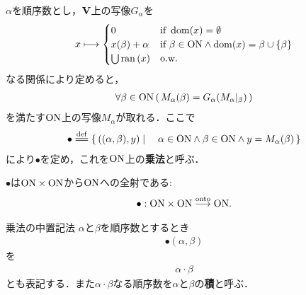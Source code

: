 	\begin{screen}
		\begin{dfn}[順序数の乗法]
			$\alpha$を順序数とし，$\mathbf{V}$上の写像$G_\alpha$を
			\begin{align}
				x \longmapsto 
				\begin{cases}
					0 & \mbox{if } \operatorname{dom}(x) = \emptyset \\
					x(\beta) + \alpha & \mbox{if } \beta \in \mathrm{ON} \wedge \operatorname{dom}(x) = \beta \cup \{\beta\} \\
					\bigcup \operatorname*{ran} \left(x\right) & \mbox{o.w.}
				\end{cases}
			\end{align}
			なる関係により定めると，
			\begin{align}
				\forall \beta \in \mathrm{ON}\, (\, M_\alpha(\beta) = G_\alpha(M_\alpha|_\beta)\, )
			\end{align}
			を満たす$\mathrm{ON}$上の写像$M_\alpha$が取れる．ここで
			\begin{align}
				\bullet \defeq \Set{((\alpha,\beta),y)}{\alpha \in \ON \wedge \beta \in \ON \wedge y = M_\alpha (\beta)}
			\end{align}
			により$\bullet$を定め，これを$\mathrm{ON}$上の{\bf 乗法}と呼ぶ．
		\end{dfn}
	\end{screen}
	
	\begin{screen}
		\begin{thm}\label{thm:multiplication_on_ordinal_numbers_is_a_mapping}
			$\bullet$は$\mathrm{ON} \times \mathrm{ON}$から$\mathrm{ON}$への全射である:
			\begin{align}
				\bullet:\mathrm{ON} \times \mathrm{ON} \overset{\mathrm{onto}}{\longrightarrow} \mathrm{ON}.
			\end{align}
		\end{thm}
	\end{screen}
	
	\begin{itembox}[l]{乗法の中置記法}
		$\alpha$と$\beta$を順序数とするとき
		\begin{align}
			\bullet (\alpha,\beta)
		\end{align}
		を
		\begin{align}
			\alpha \cdot \beta
		\end{align}
		とも表記する．また$\alpha \cdot \beta$なる順序数を$\alpha$と$\beta$の{\bf 積}と呼ぶ．
	\end{itembox}
	
